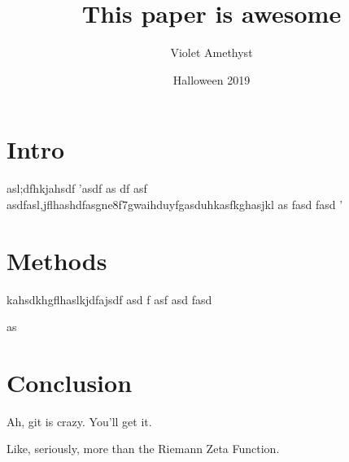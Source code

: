 \documentclass{article}
\title{This paper is awesome}
\date{Halloween 2019}
\author{Violet Amethyst}
\begin{document}
\maketitle


\section{Intro}

asl;dfhkjahsdf
'asdf
as
df
asf
asdfasl,jflhashdfasgne8f7gwaihduyfgasduhkasfkghasjkl
as
fasd
fasd
'


\section{Methods}

kahsdkhgflhaslkjdfajsdf
asd
f
asf
asd
fasd



as



\section{Conclusion}

Ah, git is crazy.  You'll get it.

Like, seriously, more than the Riemann Zeta Function.  
\end{document}
